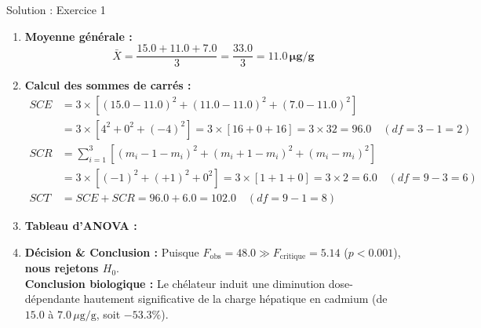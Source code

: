\documentclass[11pt,a4paper]{article}
\begin{document}
\begin{solutionbox}{Solution : Exercice 1}
\begin{enumerate}[label=\textbf{\alph*.}]
  \item \textbf{Moyenne générale :}
  \begin{equation*}
    \bar{X} = \frac{15.0 + 11.0 + 7.0}{3} = \frac{33.0}{3} = \mathbf{11.0\,\mu\text{g/g}}
  \end{equation*}
  \item \textbf{Calcul des sommes de carrés :}
  \begin{align*}
    SCE &= 3 \times \left[ (15.0 - 11.0)^2 + (11.0 - 11.0)^2 + (7.0 - 11.0)^2 \right] \\
    &= 3 \times \left[ 4^2 + 0^2 + (-4)^2 \right] = 3 \times [16 + 0 + 16] = 3 \times 32 = \mathbf{96.0} \quad (df = 3 - 1 = 2) \\[1mm]
    SCR &= \sum_{i=1}^3 \left[ (m_i - 1 - m_i)^2 + (m_i + 1 - m_i)^2 + (m_i - m_i)^2 \right] \\
    &= 3 \times [(-1)^2 + (+1)^2 + 0^2] = 3 \times [1 + 1 + 0] = 3 \times 2 = \mathbf{6.0} \quad (df = 9 - 3 = 6) \\[1mm]
    SCT &= SCE + SCR = 96.0 + 6.0 = 102.0 \quad (df = 9 - 1 = 8)
  \end{align*}
  \item \textbf{Tableau d'ANOVA :}
  \begin{center}
  \end{center}
  \item \textbf{Décision \& Conclusion :}
  Puisque $F_{\text{obs}} = 48.0 \gg F_{\text{critique}} = 5.14$ ($p < 0.001$), \textbf{nous rejetons $H_0$}.\\
  \textbf{Conclusion biologique :} Le chélateur induit une diminution dose-dépendante hautement significative de la charge hépatique en cadmium (de $15.0$ à $7.0\,\mu\text{g/g}$, soit $-53.3\%$).
\end{enumerate}
\end{solutionbox}
\end{document}
